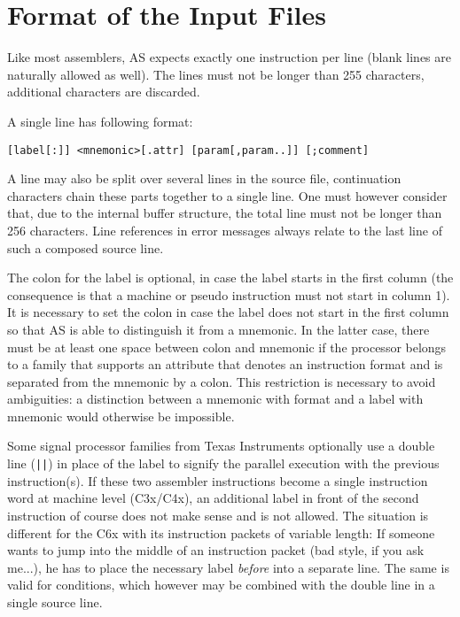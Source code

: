 \documentclass[12pt,twoside]{report}
\newcommand{\asname}{{AS}}
\begin{document}

\section{Format of the Input Files}
\label{AttrTypes}

Like most assemblers, \asname{} expects exactly one instruction per line
(blank lines are naturally allowed as well).  The lines must not be
longer than 255 characters, additional characters are discarded.

A single line has following format:
\begin{verbatim}
[label[:]] <mnemonic>[.attr] [param[,param..]] [;comment]
\end{verbatim}
A line may also be split over several lines in the source file,
continuation characters chain these parts together to a single line.  One
must however consider that, due to the internal buffer structure, the
total line must not be longer than 256 characters.  Line references in
error messages always relate to the last line of such a composed source
line.
\par
The colon for the label is optional, in case the label starts in the
first column (the consequence is that a machine or pseudo
instruction must not start in column 1).  It is necessary to set the
colon in case the label does not start in the first column so that \asname{}
is able to distinguish it from a mnemonic.  In the latter case, there
must be at least one space between colon and mnemonic if the processor
belongs to a family that supports an attribute that denotes an
instruction format and is separated from the mnemonic by a colon.  This
restriction is necessary to avoid ambiguities: a distinction between a
mnemonic with format and a label with mnemonic would otherwise be
impossible.

Some signal processor families from Texas Instruments optionally use
a double line (\verb!||!) in place of the label to signify the
parallel execution with the previous instruction(s).  If these two
assembler instructions become a single instruction word at machine
level (C3x/C4x), an additional label in front of the second
instruction of course does not make sense and is not allowed.  The
situation is different for the C6x with its instruction packets of
variable length: If someone wants to jump into the middle of an
instruction packet (bad style, if you ask me...), he has to place the
necessary label {\em before} into a separate line.  The same is valid
for conditions, which however may be combined with the double line in
a single source line.
\end{document}
